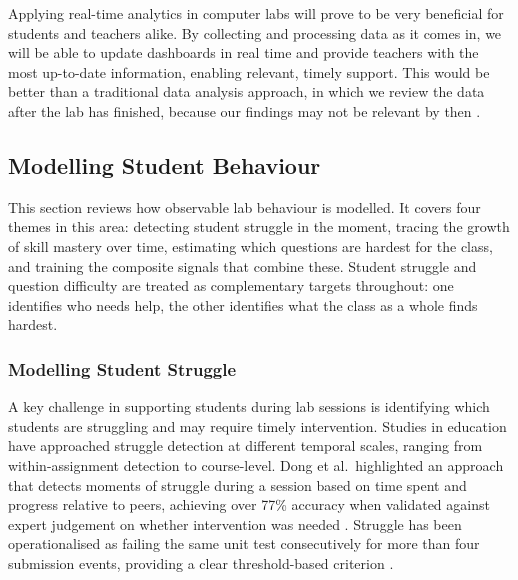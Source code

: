Applying real-time analytics in computer labs will prove to be very beneficial for students and teachers alike. By collecting and processing data as it comes in, we will be able to update dashboards in real time and provide teachers with the most up-to-date information, enabling relevant, timely support. This would be better than a traditional data analysis approach, in which we review the data after the lab has finished, because our findings may not be relevant by then \cite{montebello_assisting,mustafaayobamiraji_2024_realtime}.

\subsection{Modelling Student Behaviour}

This section reviews how observable lab behaviour is modelled. 
It covers four themes in this area: detecting student struggle in the moment, tracing the growth of skill mastery over time, estimating which questions are hardest for the class, and training the composite signals that combine these. 
Student struggle and question difficulty are treated as complementary targets throughout: one identifies who needs help, the other identifies what the class as a whole finds hardest.


\subsubsection{Modelling Student Struggle}
A key challenge in supporting students during lab sessions is identifying which students are struggling and may require timely intervention. 
Studies in education have approached struggle detection at different temporal scales, ranging from within-assignment detection to course-level.
Dong et al.\ highlighted an approach that detects moments of struggle during a session based on time spent and progress relative to peers, achieving over 77\% accuracy when validated against expert judgement on whether intervention was needed \cite{dong_using}.
Struggle has been operationalised as failing the same unit test consecutively for more than four submission events, providing a clear threshold-based criterion \cite{dong_using}.

